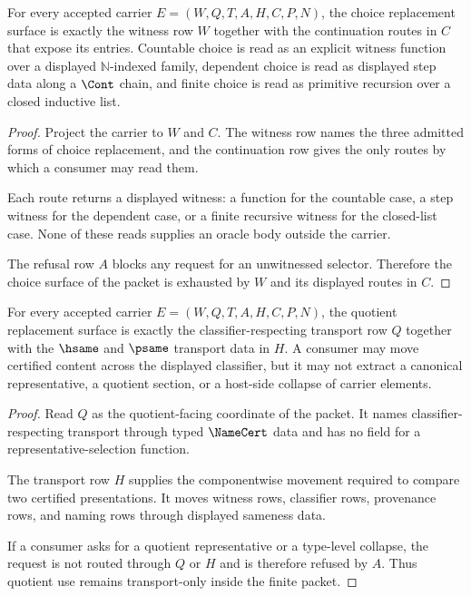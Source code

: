 \begin{theorem}
\label{thm:effective-replacement-ledger-choice-row}
For every accepted carrier $E=(W,Q,T,A,H,C,P,N)$, the choice replacement surface is exactly the witness row $W$ together with the continuation routes in $C$ that expose its entries. Countable choice is read as an explicit witness function over a displayed $\mathbb{N}$-indexed family, dependent choice is read as displayed step data along a $\Cont$ chain, and finite choice is read as primitive recursion over a closed inductive list.
\end{theorem}
\begin{proof}
Project the carrier to $W$ and $C$. The witness row names the three admitted forms of choice replacement, and the continuation row gives the only routes by which a consumer may read them.

Each route returns a displayed witness: a function for the countable case, a step witness for the dependent case, or a finite recursive witness for the closed-list case. None of these reads supplies an oracle body outside the carrier.

The refusal row $A$ blocks any request for an unwitnessed selector. Therefore the choice surface of the packet is exhausted by $W$ and its displayed routes in $C$.
\end{proof}

\begin{theorem}
\label{thm:effective-replacement-ledger-quot-transport-row}
For every accepted carrier $E=(W,Q,T,A,H,C,P,N)$, the quotient replacement surface is exactly the classifier-respecting transport row $Q$ together with the $\hsame$ and $\psame$ transport data in $H$. A consumer may move certified content across the displayed classifier, but it may not extract a canonical representative, a quotient section, or a host-side collapse of carrier elements.
\end{theorem}
\begin{proof}
Read $Q$ as the quotient-facing coordinate of the packet. It names classifier-respecting transport through typed $\NameCert$ data and has no field for a representative-selection function.

The transport row $H$ supplies the componentwise movement required to compare two certified presentations. It moves witness rows, classifier rows, provenance rows, and naming rows through displayed sameness data.

If a consumer asks for a quotient representative or a type-level collapse, the request is not routed through $Q$ or $H$ and is therefore refused by $A$. Thus quotient use remains transport-only inside the finite packet.
\end{proof}

